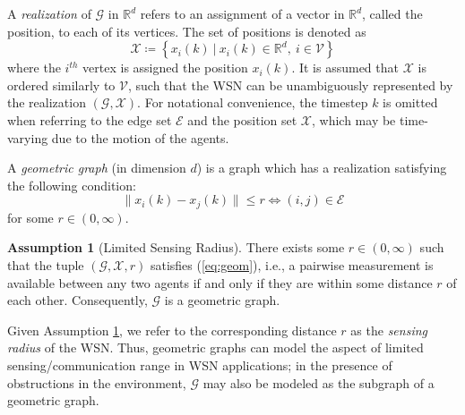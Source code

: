 \documentclass[twocolumn]{article}
\theoremstyle{plain}
\theoremstyle{definition}
\theoremstyle{definition}
\newtheorem{assumption}{Assumption}
\theoremstyle{remark}
\begin{document}
A \textit{realization} of $\mathcal G$ in $\mathbb R^d$ refers to an assignment of a vector in $\mathbb R^d$, called the position, to each of its vertices. The set of positions is denoted as
\begin{equation}
    \mathcal X \coloneqq \left\lbrace x_i(k)\ \big\vert\ x_i(k) \in \mathbb R^d,\ i\in \mathcal V \right\rbrace
\end{equation}
where the $i^{th}$ vertex is assigned the position $x_i(k)$. It is assumed that $\mathcal X$ is ordered similarly to $\mathcal V$, such that the WSN can be unambiguously represented by the realization $(\mathcal G, \mathcal X)$. For notational convenience, the timestep $k$ is omitted when referring to the edge set $\mathcal E$ and the position set $\mathcal X$, which may be time-varying due to the motion of the agents. 

A \textit{geometric graph} (in dimension $d$) is a graph which has a realization satisfying the following condition:
\begin{equation}
\|x_i(k)-x_j(k)\|\leq r \iff (i,j) \in \mathcal E
\label{eq:geom}
\end{equation}
for some $r \in (0, \infty)$.
\begin{assumption}[Limited Sensing Radius]
There exists some $r\in (0, \infty)$ such that the tuple $(\mathcal G, \mathcal X, r)$ satisfies (\ref{eq:geom}), i.e., a pairwise measurement is available between any two agents if and only if they are within some distance $r$ of each other. Consequently, $\mathcal G$ is a geometric graph.
\label{ass:geom}
\end{assumption}
Given Assumption \ref{ass:geom}, we refer to the corresponding distance $r$ as the \textit{sensing radius} of the WSN. Thus, geometric graphs can model the aspect of limited sensing/communication range in WSN applications; in the presence of obstructions in the environment, $\mathcal G$ may also be modeled as the subgraph of a geometric graph.
\end{document}
